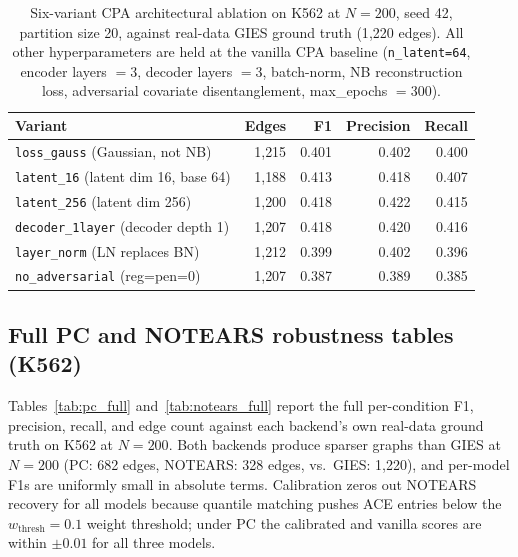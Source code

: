 \documentclass{article}
\theoremstyle{plain}
\theoremstyle{definition}
\theoremstyle{remark}
\begin{document}
\begin{table}[h]
\centering
\small
\begin{tabular}{lrrrr}
\toprule
\textbf{Variant} & \textbf{Edges} & \textbf{F1} & \textbf{Precision} & \textbf{Recall} \\
\midrule
\texttt{loss\_gauss}\,\,(Gaussian, not NB)        & 1{,}215 & 0.401 & 0.402 & 0.400 \\
\texttt{latent\_16}\,\,(latent dim 16, base 64)  & 1{,}188 & 0.413 & 0.418 & 0.407 \\
\texttt{latent\_256}\,\,(latent dim 256)         & 1{,}200 & 0.418 & 0.422 & 0.415 \\
\texttt{decoder\_1layer}\,\,(decoder depth 1)    & 1{,}207 & 0.418 & 0.420 & 0.416 \\
\texttt{layer\_norm}\,\,(LN replaces BN)         & 1{,}212 & 0.399 & 0.402 & 0.396 \\
\texttt{no\_adversarial}\,\,(reg=pen=0)          & 1{,}207 & 0.387 & 0.389 & 0.385 \\
\bottomrule
\end{tabular}
\caption{Six-variant CPA architectural ablation on K562 at $N{=}200$, seed 42, partition size 20, against real-data GIES ground truth (1{,}220 edges). All other hyperparameters are held at the vanilla CPA baseline (\texttt{n\_latent=64}, encoder layers $=3$, decoder layers $=3$, batch-norm, NB reconstruction loss, adversarial covariate disentanglement, max\_epochs $=300$).}
\label{tab:ablation_cpa}
\end{table}

\subsection{Full PC and NOTEARS robustness tables (K562)}
\label{app:pc_notears}
Tables~\ref{tab:pc_full} and~\ref{tab:notears_full} report the full per-condition F1, precision, recall, and edge count against each backend's own real-data ground truth on K562 at $N{=}200$. Both backends produce sparser graphs than GIES at $N{=}200$ (PC: 682 edges, NOTEARS: 328 edges, vs.\ GIES: 1{,}220), and per-model F1s are uniformly small in absolute terms. Calibration zeros out NOTEARS recovery for all models because quantile matching pushes ACE entries below the $w_{\mathrm{thresh}}{=}0.1$ weight threshold; under PC the calibrated and vanilla scores are within $\pm 0.01$ for all three models.
\end{document}
